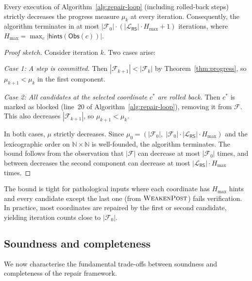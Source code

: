 \documentclass[11pt]{article}
\newcommand{\RF}{\mathcal{F}}               %
\newcommand{\RS}{\mathsf{RS}}               %
\newcommand{\WeakenPost}{\textsc{WeakenPost}}
\begin{document}
\begin{theorem}
\label{thm:strong-convergence}
Every execution of Algorithm~\ref{alg:repair-loop} (including rolled-back
steps) strictly decreases the progress measure $\mu_k$ at every iteration.
Consequently, the algorithm terminates in at most
$|\RF_0| \cdot (|\mathcal{L}_\RS| \cdot H_{\max} + 1)$ iterations,
where $H_{\max} = \max_c |\mathsf{hints}(\mathsf{Obs}(c))|$.
\end{theorem}

\begin{proof}[Proof sketch]
Consider iteration $k$.  Two cases arise:

\emph{Case 1: A step is committed.}  Then $|\RF_{k+1}| < |\RF_k|$ by
Theorem~\ref{thm:progress}, so $\mu_{k+1} < \mu_k$ in the first component.

\emph{Case 2: All candidates at the selected coordinate $c^*$ are rolled
back.}  Then $c^*$ is marked as blocked (line~20 of
Algorithm~\ref{alg:repair-loop}), removing it from $\RF$.  This also
decreases $|\RF_{k+1}|$, so $\mu_{k+1} < \mu_k$.

In both cases, $\mu$ strictly decreases.  Since $\mu_0 =
(|\RF_0|,\; |\RF_0| \cdot |\mathcal{L}_\RS| \cdot H_{\max})$ and the
lexicographic order on $\mathbb{N} \times \mathbb{N}$ is well-founded,
the algorithm terminates.  The bound follows from the observation that
$|\RF|$ can decrease at most $|\RF_0|$ times, and between decreases
the second component can decrease at most $|\mathcal{L}_\RS| \cdot H_{\max}$
times.
\end{proof}

\begin{remark}[Tightness]
The bound is tight for pathological inputs where each coordinate has
$H_{\max}$ hints and every candidate except the last one (from $\WeakenPost$)
fails verification.  In practice, most coordinates are repaired by the first
or second candidate, yielding iteration counts close to $|\RF_0|$.
\end{remark}

\subsection{Soundness and completeness}
\label{subsec:soundness-completeness}

We now characterise the fundamental trade-offs between soundness and
completeness of the repair framework.
\end{document}
